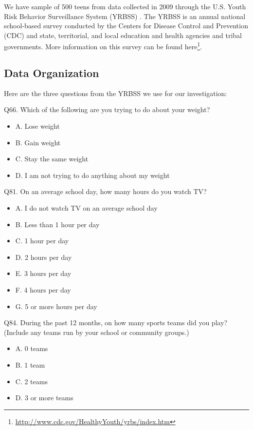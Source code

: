 \documentclass[
]{krantz}
\providecommand{\tightlist}{%
  \setlength{\itemsep}{0pt}\setlength{\parskip}{0pt}}
\renewcommand{\href}[2]{#2\footnote{\url{#1}}}
\begin{document}
We have sample of 500 teens from data collected in 2009 through the U.S. Youth Risk Behavior Surveillance System (YRBSS) \citep{YRBS2009}. The YRBSS is an annual national school-based survey conducted by the Centers for Disease Control and Prevention (CDC) and state, territorial, and local education and health agencies and tribal governments. More information on this survey can be found \href{http://www.cdc.gov/HealthyYouth/yrbs/index.htm}{here}.

\hypertarget{data-organization-4}{%
\subsection{Data Organization}\label{data-organization-4}}

Here are the three questions from the YRBSS we use for our investigation:

Q66. Which of the following are you trying to do about your weight?

\begin{itemize}
\tightlist
\item
  A. Lose weight
\item
  B. Gain weight
\item
  C. Stay the same weight
\item
  D. I am not trying to do anything about my weight
\end{itemize}

Q81. On an average school day, how many hours do you watch TV?

\begin{itemize}
\tightlist
\item
  A. I do not watch TV on an average school day
\item
  B. Less than 1 hour per day
\item
  C. 1 hour per day
\item
  D. 2 hours per day
\item
  E. 3 hours per day
\item
  F. 4 hours per day
\item
  G. 5 or more hours per day
\end{itemize}

Q84. During the past 12 months, on how many sports teams did you play? (Include any teams run by your school or community groups.)

\begin{itemize}
\tightlist
\item
  A. 0 teams
\item
  B. 1 team
\item
  C. 2 teams
\item
  D. 3 or more teams
\end{itemize}
\end{document}
